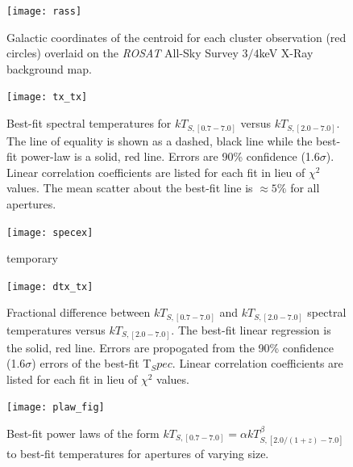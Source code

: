 \documentclass[12pt, preprint]{aastex}
\begin{document}
\begin{figure}[htp]
\begin{center}
\texttt{[image: rass]}
\caption{\small Galactic coordinates of the centroid for each cluster
observation (red circles) overlaid on the {\textit{ROSAT}} All-Sky Survey $3/4$keV
X-Ray background map.}
\label{fig:rass}
\end{center}
\end{figure}

\begin{figure}[htp]
\begin{center}
\texttt{[image: tx\_tx]}
\caption{\small Best-fit spectral temperatures for $kT_{S,[0.7-7.0]}$
versus $kT_{S,[2.0-7.0]}$. The line of equality is shown as a dashed,
black line while the best-fit power-law is a solid, red line. Errors
are 90\% confidence (1.6$\sigma$). Linear correlation coefficients are
listed for each fit in lieu of $\chi^2$ values. The mean scatter about
the best-fit line is $\approx5\%$ for all apertures.}
\label{fig:tx_tx}
\end{center}
\end{figure}

\begin{figure}[htp]
\begin{center}
\texttt{[image: specex]}
\caption{\small temporary}
\label{fig:specex}
\end{center}
\end{figure}

\begin{figure}[htp]
\begin{center}
\texttt{[image: dtx\_tx]}
\caption{\small Fractional difference between $kT_{S,[0.7-7.0]}$ and
$kT_{S,[2.0-7.0]}$ spectral temperatures versus
$kT_{S,[2.0-7.0]}$. The best-fit linear regression is the solid, red line. Errors
are propogated from the 90\% confidence (1.6$\sigma$) errors of the
best-fit T$_Spec$. Linear correlation coefficients are
listed for each fit in lieu of $\chi^2$ values.}
\label{fig:dtx_tx}
\end{center}
\end{figure}

\begin{figure}[htp]
\begin{center}
\texttt{[image: plaw\_fig]}
\caption{\small Best-fit power laws of the form $kT_{S,[0.7-7.0]} =
\alpha kT_{S,[2.0/(1+z)-7.0]}^{\beta}$ to best-fit temperatures for
apertures of varying size.}
\label{fig:plaws}
\end{center}
\end{figure}
\end{document}
